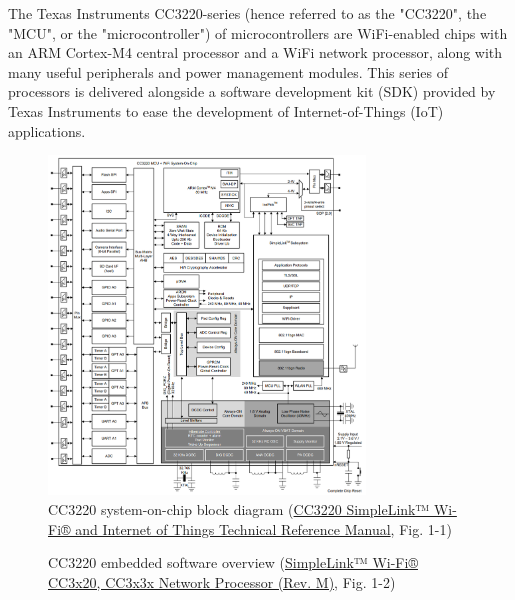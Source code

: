 \begin{flushleft}
    The Texas Instruments CC3220-series (hence referred to as the "CC3220", the
    "MCU", or the "microcontroller") of microcontrollers are WiFi-enabled
    chips with an ARM Cortex-M4 central processor and a WiFi network processor,
    along with many useful peripherals and power management modules. This
    series of processors is delivered alongside a software development kit
    (SDK) provided by Texas Instruments to ease the development of
    Internet-of-Things (IoT) applications.
    \begin{figure}[H]
        \caption{CC3220 system-on-chip block diagram (\href{https://www.ti.com/lit/ug/swru465/swru465.pdf}{CC3220 SimpleLink™ Wi-Fi® and Internet of Things Technical Reference Manual}, Fig. 1-1)}
        \label{cc3220_soc}
        \centering
        \includegraphics[width=0.75\textwidth]{images/cc3220_soc.png}
    \end{figure}
    \begin{figure}[H]
        \caption{CC3220 embedded software overview (\href{https://www.ti.com/lit/ds/symlink/cc3220s.pdf}{SimpleLink™ Wi-Fi® CC3x20, CC3x3x Network Processor (Rev. M)}, Fig. 1-2)}
        \label{cc3220_sw_overview}
        \centering

\end{figure}
\end{flushleft}
